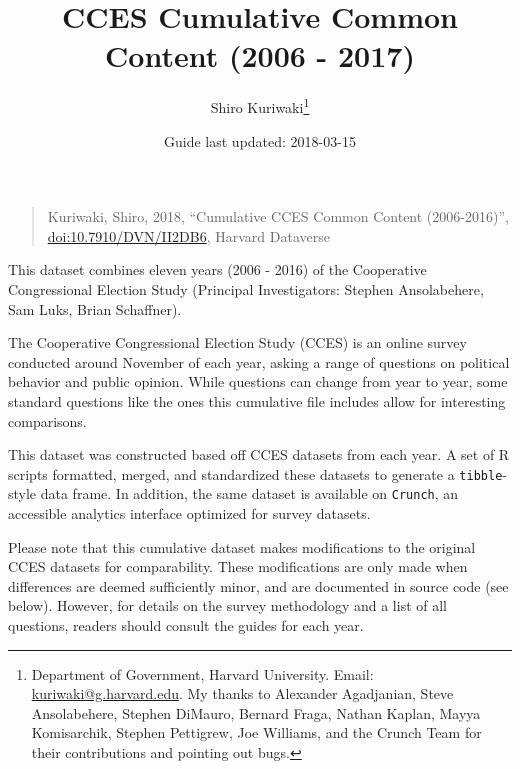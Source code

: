 \documentclass[10pt,article,oneside]{memoir}
\title{ \LARGE\textbf{CCES Cumulative Common Content (2006 - 2017)}}
\author{Shiro Kuriwaki\thanks{Department of Government, Harvard University. Email:
\url{kuriwaki@g.harvard.edu}. My thanks to Alexander Agadjanian, Steve
Ansolabehere, Stephen DiMauro, Bernard Fraga, Nathan Kaplan, Mayya
Komisarchik, Stephen Pettigrew, Joe Williams, and the Crunch Team for
their contributions and pointing out bugs.}  }
\date{Guide last updated: 2018-03-15}
\theoremstyle{definition}
\begin{document}
\maketitle





\renewcommand\UrlFont{\color{crimson}\ttfamily}
















\begin{quote}
Kuriwaki, Shiro, 2018, ``Cumulative CCES Common Content (2006-2016)'',
\href{https://dataverse.harvard.edu/dataset.xhtml?persistentId=doi:10.7910/DVN/II2DB6}{\url{doi:10.7910/DVN/II2DB6}},
Harvard Dataverse
\end{quote}

\noindent This dataset combines eleven years (2006 - 2016) of the
Cooperative Congressional Election Study (Principal Investigators:
Stephen Ansolabehere, Sam Luks, Brian Schaffner).

The Cooperative Congressional Election Study (CCES) is an online survey
conducted around November of each year, asking a range of questions on
political behavior and public opinion. While questions can change from
year to year, some standard questions like the ones this cumulative file
includes allow for interesting comparisons.

This dataset was constructed based off CCES datasets from each year. A
set of R scripts formatted, merged, and standardized these datasets to
generate a \texttt{tibble}-style data frame. In addition, the same
dataset is available on \texttt{Crunch}, an accessible analytics
interface optimized for survey datasets.

Please note that this cumulative dataset makes modifications to the
original CCES datasets for comparability. These modifications are only
made when differences are deemed sufficiently minor, and are documented
in source code (see below). However, for details on the survey
methodology and a list of all questions, readers should consult the
guides for each year.

\bigskip
\end{document}
